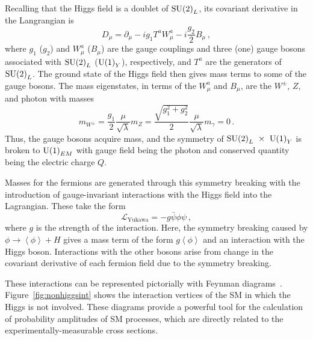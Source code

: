 Recalling that the Higgs field is a doublet of ${\rm SU(2)}_L$, its covariant derivative in the
Langrangian is
\begin{equation}
D_\mu = \partial_\mu - i g_1 T^a W^a_\mu - i \frac{g_2}{2} B_\mu \,,
\end{equation}
where $g_1$ ($g_2$) and $W^a_\mu$ ($B_\mu$) are the gauge couplings and three (one) gauge bosons
associated with ${\rm SU(2)}_L$ (${\rm U(1)}_Y$), respectively, and $T^a$ are the generators of
${\rm SU(2)}_L$. The ground state of the Higgs field then gives mass terms to some of the gauge bosons.
The mass eigenstates, in terms of the $W^a_\mu$ and $B_\mu$, are the $W^\pm$, $Z$, and photon with
masses
\begin{subequations}
\begin{equation}
m_{W^\pm} = \frac{g_1}{2}\frac{\mu}{\sqrt{\lambda}}
\end{equation}
\begin{equation}
m_Z = \frac{\sqrt{g_1^2+g_2^2}}{2}\frac{\mu}{\sqrt{\lambda}}
\end{equation}
\begin{equation}
m_\gamma = 0 \,.
\end{equation}
\end{subequations}
Thus, the gauge bosons acquire mass, and the symmetry of ${\rm SU(2)}_L~\times~{\rm U(1)}_Y$ is
broken to ${\rm U(1)}_{EM}$ with gauge field being the photon and conserved quantity being the
electric charge $Q$.  

Masses for the fermions are generated through this symmetry breaking with the introduction of
gauge-invariant interactions with the Higgs field into the Lagrangian. These take the form
\begin{equation}
\mathcal{L}_{\text{Yukawa}} = -g \bar{\psi}\phi\psi \,,
\end{equation}
where $g$ is the strength of the interaction. Here, the symmetry breaking caused by
$\phi \rightarrow \left\langle \phi \right\rangle + H$ gives a mass term of the form
$g \left\langle \phi \right\rangle$ and an interaction with the Higgs boson. Interactions with the
other bosons arise from change in the covariant derivative of each fermion field due to the
symmetry breaking.

These interactions can be represented pictorially with
Feynman diagrams~\cite{1948.Feynman.path-integral-QM}. Figure~\ref{fig:nonhiggsint} shows the
interaction vertices of the SM in which the Higgs is not involved. These diagrams provide a powerful
tool for the calculation of probability amplitudes of SM processes, which are directly related to the
experimentally-measurable cross sections.

